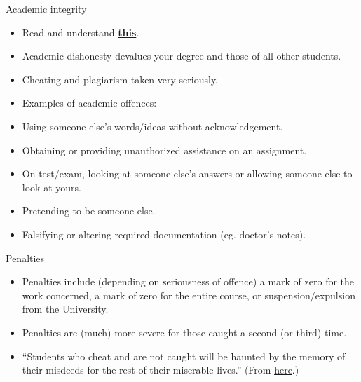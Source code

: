\documentclass[ignorenonframetext,]{beamer}
\providecommand{\tightlist}{%
  \setlength{\itemsep}{0pt}\setlength{\parskip}{0pt}}
\begin{document}
\begin{frame}{Academic integrity}
\protect\hypertarget{academic-integrity}{}

\begin{itemize}
\tightlist
\item
  Read and understand
  \href{http://www.utoronto.ca/academicintegrity/}{\textbf{this}}.
\item
  Academic dishonesty devalues your degree and those of all other
  students.
\item
  Cheating and plagiarism taken very seriously.
\item
  Examples of academic offences:
\item
  Using someone else's words/ideas without acknowledgement.
\item
  Obtaining or providing unauthorized assistance on an assignment.
\item
  On test/exam, looking at someone else's answers or allowing someone
  else to look at yours.
\item
  Pretending to be someone else.
\item
  Falsifying or altering required documentation (eg. doctor's notes).
\end{itemize}

\end{frame}

\begin{frame}{Penalties}
\protect\hypertarget{penalties}{}

\begin{itemize}
\tightlist
\item
  Penalties include (depending on seriousness of offence) a mark of zero
  for the work concerned, a mark of zero for the entire course, or
  suspension/expulsion from the University.
\item
  Penalties are (much) more severe for those caught a second (or third)
  time.
\item
  ``Students who cheat and are not caught will be haunted by the memory
  of their misdeeds for the rest of their miserable lives.'' (From
  \href{https://philosophy.osu.edu/sites/philosophy.osu.edu/files/1100\%20Brown_2.pdf}{here}.)
\end{itemize}

\end{frame}
\end{document}
